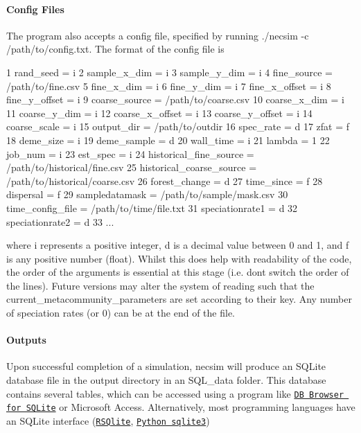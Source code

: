 \paragraph*{Config Files}

The program also accepts a config file, specified by running {\ttfamily ./necsim -\/c /path/to/config.txt}. The format of the config file is 
\begin{DoxyCode}
1 rand\_seed = i
2 sample\_x\_dim = i
3 sample\_y\_dim = i
4 fine\_source = /path/to/fine.csv
5 fine\_x\_dim = i
6 fine\_y\_dim = i
7 fine\_x\_offset = i
8 fine\_y\_offset = i
9 coarse\_source = /path/to/coarse.csv
10 coarse\_x\_dim = i
11 coarse\_y\_dim = i
12 coarse\_x\_offset = i
13 coarse\_y\_offset = i
14 coarse\_scale = i
15 output\_dir = /path/to/outdir
16 spec\_rate = d
17 zfat = f
18 deme\_size = i
19 deme\_sample = d
20 wall\_time = i
21 lambda = 1
22 job\_num = i
23 est\_spec = i
24 historical\_fine\_source = /path/to/historical/fine.csv
25 historical\_coarse\_source = /path/to/historical/coarse.csv
26 forest\_change = d
27 time\_since = f
28 dispersal = f
29 sampledatamask = /path/to/sample/mask.csv
30 time\_config\_file = /path/to/time/file.txt
31 speciationrate1 = d
32 speciationrate2 = d
33 ...
\end{DoxyCode}
 where {\ttfamily i} represents a positive integer, {\ttfamily d} is a decimal value between 0 and 1, and {\ttfamily f} is any positive number (float). Whilst this does help with readability of the code, the order of the arguments is essential at this stage (i.\+e. don\textquotesingle{}t switch the order of the lines). Future versions may alter the system of reading such that the current\+\_\+metacommunity\+\_\+parameters are set according to their key. Any number of speciation rates (or 0) can be at the end of the file.

\paragraph*{Outputs}

Upon successful completion of a simulation, necsim will produce an S\+Q\+Lite database file in the output directory in an S\+Q\+L\+\_\+data folder. This database contains several tables, which can be accessed using a program like \href{http://sqlitebrowser.org/}{\tt DB Browser for S\+Q\+Lite} or Microsoft Access. Alternatively, most programming languages have an S\+Q\+Lite interface (\href{https://cran.r-project.org/web/packages/RSQLite/index.html}{\tt R\+S\+Qlite}, \href{https://docs.python.org/2/library/sqlite3.html}{\tt Python sqlite3})


